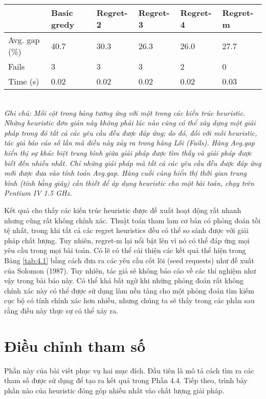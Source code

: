 \begin{table}[caption={Hiệu suất của Kiến trúc Heuristics}, label=tab:4.1]
    \begin{tabular}{@{}llllll@{}}
        \toprule
                      & Basic gredy & Regret-2 & Regret-3 & Regret-4 & Regret-m \\ \midrule
        Avg. gap (\%) & 40.7        & 30.3     & 26.3     & 26.0     & 27.7     \\
        Fails         & 3           & 3        & 3        & 2        & 0        \\
        Time (s)      & 0.02        & 0.02     & 0.02     & 0.02     & 0.03     \\ \bottomrule
    \end{tabular} \\
    \justify
    \textit{Ghi chú: Mỗi cột trong bảng tương ứng với một trong các kiến trúc heuristic. Những heuristic đơn giản này không phải lúc nào cũng có thể xây dựng một giải pháp trong đó tất cả các yêu cầu đều được đáp ứng; do đó, đối với mỗi heuristic, tác giả báo cáo số lần mà điều này xảy ra trong hàng Lỗi (Fails). Hàng Avg.gap hiển thị sự khác biệt trung bình giữa giải pháp được tìm thấy và giải pháp được biết đến nhiều nhất. Chỉ những giải pháp mà tất cả các yêu cầu đều được đáp ứng mới được đưa vào tính toán Avg.gap. Hàng cuối cùng hiển thị thời gian trung bình (tính bằng giây) cần thiết để áp dụng heuristic cho một bài toán, chạy trên Pentium IV 1.5 GHz.}
\end{table}



Kết quả cho thấy các kiến trúc heuristic được đề xuất hoạt động rất nhanh nhưng cũng rất không chính xác. Thuật toán tham lam cơ bản có phỏng đoán tồi tệ nhất, trong khi tất cả các regret heuristics đều có thể so sánh được với giải pháp chất lượng. Tuy nhiên, regret-m lại nổi bật lên vì nó có thể đáp ứng mọi yêu cầu trong mọi bài toán. Có lẽ có thể cải thiện các kết quả thể hiện trong Bảng \ref{tab:4.1} bằng cách đưa ra các yêu cầu cốt lõi (seed requests) như đề xuất của Solomon (1987). Tuy nhiên, tác giả sẽ không báo cáo về các thí nghiệm như vậy trong bài báo này. Có thể khá bất ngờ khi những phỏng đoán rất không chính xác này có thể được sử dụng làm nền tảng cho một phỏng đoán tìm kiếm cục bộ có tính chính xác hơn nhiều, nhưng chúng ta sẽ thấy trong các phần sau rằng điều này thực sự có thể xảy ra.


\section{Điều chỉnh tham số}
Phần này của bài viết phục vụ hai mục đích. Đầu tiên là mô tả cách tìm ra các tham số được sử dụng để tạo ra kết quả trong Phần 4.4. Tiếp theo, trình bày phần nào của heuristic đóng góp nhiều nhất vào chất lượng giải pháp.

